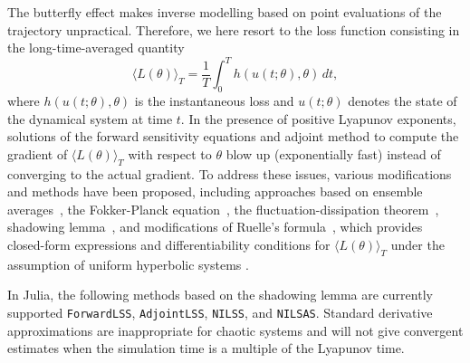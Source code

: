 The butterfly effect makes inverse modelling based on point evaluations of the trajectory unpractical. 
Therefore, we here resort to the loss function consisting in the long-time-averaged quantity 
\begin{equation}\label{eq:long_time_averaged_quantities}
    \langle L(\theta) \rangle_T = \frac{1}{T} \int_0^T h(u(t; \theta), \theta) \, dt, 
\end{equation}
where $h(u(t; \theta), \theta)$ is the instantaneous loss and $u(t; \theta)$ denotes the state of the dynamical system at time $t$.
In the presence of positive Lyapunov exponents, solutions of the forward sensitivity equations and adjoint method to compute the gradient of $\langle L(\theta) \rangle_T$ with respect to $\theta$ blow up (exponentially fast) instead of converging to the actual gradient.
To address these issues, various modifications and methods have been proposed, including approaches based on ensemble averages~\cite{lea2000sensitivity, eyink2004ruelle}, the Fokker-Planck equation~\cite{thuburn2005climate, blonigan2014probability}, the fluctuation-dissipation theorem~\cite{leith1975climate, abramov2007blended, abramov2008new}, shadowing lemma~\cite{wang2013forward, wang2014least, wang2014convergence, ni2017sensitivity, blonigan2017adjoint, blonigan2018multiple, ni2019adjoint, ni2019sensitivity}, and modifications of Ruelle's formula~\cite{chandramoorthy2022efficient, ni2020fast}, which provides closed-form expressions and differentiability conditions for $ \langle L(\theta) \rangle_T$ under the assumption of uniform hyperbolic systems \cite{ruelle1997differentiation,ruelle2009review}.


In Julia, the following methods based on the shadowing lemma are currently supported \texttt{ForwardLSS},  \texttt{AdjointLSS}, \texttt{NILSS}, and \texttt{NILSAS}. 
Standard derivative approximations are inappropriate for chaotic systems and will not give convergent estimates when the simulation time is a multiple of the Lyapunov time.